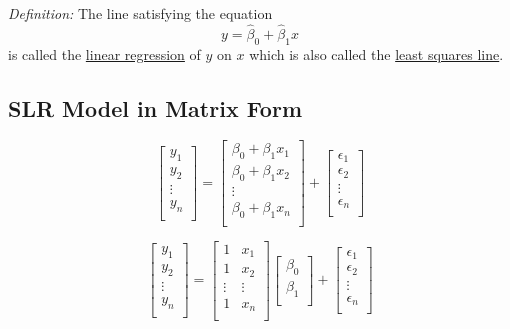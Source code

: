 {\it Definition: } The line satisfying the equation
$$
y = \hat{\beta}_0 + \hat{\beta}_1 x
$$
is called the \underline{linear regression} of $y$ on $x$ which is also called the \underline{least squares line}.

\subsection*{SLR Model in Matrix Form}

\begin{equation*}
\left[ \begin{array}{c} y_1\\ y_2 \\ \vdots \\ y_n\\ \end{array} \right] =
\left[ \begin{array}{c} \beta_0 + \beta_1 x_1\\ \beta_0 + \beta_1 x_2 \\ \vdots \\ \beta_0 + \beta_1 x_n\\ \end{array} \right] +
\left[ \begin{array}{c} \epsilon_1\\ \epsilon_2 \\ \vdots \\ \epsilon_n\\ \end{array} \right]
\end{equation*}

\begin{equation*}
\left[ \begin{array}{c} y_1\\ y_2 \\ \vdots \\ y_n\\ \end{array} \right] =
\left[ \begin{array}{cc} 1   &x_1\\ 1 & x_2 \\ \vdots & \vdots \\ 1 & x_n\\ \end{array} \right] \left[ \begin{array}{c} \beta_0\\ \beta_1 \\ \end{array} \right] +
\left[ \begin{array}{c} \epsilon_1\\ \epsilon_2 \\ \vdots \\ \epsilon_n\\ \end{array} \right]
\end{equation*}

